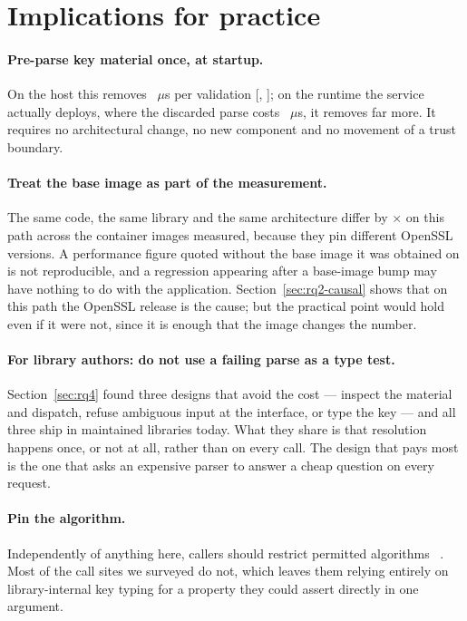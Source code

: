 \documentclass[pdflatex,sn-basic,twocolumn]{sn-jnl}%
\providecommand{\DIFaddbegin}{} %
\providecommand{\DIFaddend}{} %
\providecommand{\DIFdelbegin}{} %
\providecommand{\DIFdelend}{} %
\newcommand{\DIFscaledelfig}{0.5}
\newlength{\DIFdelgraphicswidth} %
\newlength{\DIFdelgraphicsheight} %
\newcommand{\DIFaddincludegraphics}[2][]{{\color{blue}\fbox{\DIFOincludegraphics[#1]{#2}}}} %
\newcommand{\DIFdelincludegraphics}[2][]{%
\sbox{\DIFdelgraphicsbox}{\DIFOincludegraphics[#1]{#2}}%
\settoboxwidth{\DIFdelgraphicswidth}{\DIFdelgraphicsbox} %
\settoboxtotalheight{\DIFdelgraphicsheight}{\DIFdelgraphicsbox} %
\scalebox{\DIFscaledelfig}{%
\parbox[b]{\DIFdelgraphicswidth}{\usebox{\DIFdelgraphicsbox}\\[-\baselineskip] \rule{\DIFdelgraphicswidth}{0em}}\llap{\resizebox{\DIFdelgraphicswidth}{\DIFdelgraphicsheight}{%
\setlength{\unitlength}{\DIFdelgraphicswidth}%
\begin{picture}(1,1)%
\thicklines\linethickness{2pt} %
{\color[rgb]{1,0,0}\put(0,0){\framebox(1,1){}}}%
{\color[rgb]{1,0,0}\put(0,0){\line( 1,1){1}}}%
{\color[rgb]{1,0,0}\put(0,1){\line(1,-1){1}}}%
\end{picture}%
}\hspace*{3pt}}} %
} %
\DeclareRobustCommand{\DIFaddbegin}{\DIFOaddbegin \let\includegraphics\DIFaddincludegraphics} %
\DeclareRobustCommand{\DIFaddend}{\DIFOaddend \let\includegraphics\DIFOincludegraphics} %
\DeclareRobustCommand{\DIFdelbegin}{\DIFOdelbegin \let\includegraphics\DIFdelincludegraphics} %
\DeclareRobustCommand{\DIFdelend}{\DIFOaddend \let\includegraphics\DIFOincludegraphics} %
\begin{document}
\section{Implications for practice}\label{sec:implications}

\paragraph{Pre-parse key material once, at startup.} On the host this removes
\HostStringPenalty~$\mu$s per validation
[\HostStringPenaltyCiLo, \HostStringPenaltyCiHi]; on the runtime the service
actually deploys, where the discarded parse costs
\NodeEighteenProbeThrows~$\mu$s, it removes far more. It requires no
architectural change, no new component and no movement of a trust boundary.

\paragraph{Treat the base image as part of the measurement.} The same code, the
same library and the same architecture differ by \SpanProbeThrows$\times$ on this
path across the container images measured, because they pin different OpenSSL
versions. A performance figure quoted without the base image it was obtained on
is not reproducible, and a regression appearing after a base-image bump may have
nothing to do with the application. Section~\ref{sec:rq2-causal} shows that on
this path the OpenSSL release is the cause; but the practical point would hold
even if it were not, since it is enough that the image changes the number.

\paragraph{For library authors: do not use a failing parse as a type test.}
Section~\ref{sec:rq4} found three designs that avoid the cost --- inspect the
material and dispatch, refuse ambiguous input at the interface, or type the
key --- and all three ship in maintained libraries today. What they share is
that resolution happens once, or not at all, rather than on every call. The
design that pays most is the one that asks an expensive parser to answer a cheap
question on every request.

\paragraph{Pin the algorithm.} Independently of anything here, callers should
restrict permitted algorithms~\DIFdelbegin %
\DIFdelend \DIFaddbegin \citep{rfc8725}\DIFaddend . Most of the call sites we surveyed
do not, which leaves them relying entirely on library-internal key typing for a
property they could assert directly in one argument.
\end{document}
